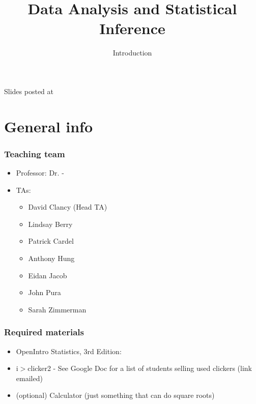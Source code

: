 \documentclass[11pt,containsverbatim,handout,xcolor=xelatex,dvipsnames,table]{beamer}
\title{Data Analysis and Statistical Inference}
\subtitle{Introduction}
\author{\CourseName}
\date{}
\institute{\InstituteName}
\begin{document}



\begin{frame}[plain]

\titlepage

\vfill

{\scriptsize {} \hfill Slides posted at  \webURL{\CourseSite}}

\addtocounter{framenumber}{-1} 

\end{frame}


\section{General info}


\begin{frame}
\frametitle{Teaching team}

\begin{itemize}

\item Professor: Dr. \FirstName{} \LastName{} - \mail{\Email{}}

\item TAs:
\begin{itemize}
\item David Clancy (Head TA)
\item Lindsay Berry
\item Patrick Cardel
\item Anthony Hung
\item Eidan Jacob
\item John Pura
\item Sarah Zimmerman
\end{itemize}

\end{itemize}

\end{frame}


\begin{frame}
\frametitle{Required materials}

\begin{itemize}

\item OpenIntro Statistics, 3rd Edition: 

\item i$>$clicker2 - See Google Doc for a list of students selling used clickers 
(link emailed)

\item (optional) Calculator (just something that can do square roots)

\end{itemize}

\end{frame}
\end{document}
